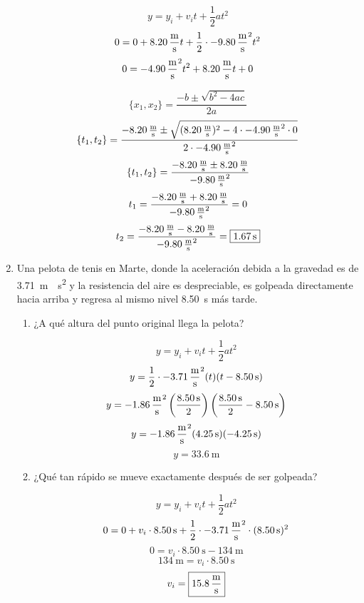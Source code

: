 \documentclass[Análisis.root.tex]{subfiles}
\begin{document}
\begin{enumerate}
        \[y=y_i+v_it+\frac{1}{2}at^2\]
        \[0=0+\SI{8,20}{\meter\over\second}t+\frac{1}{2}\cdot\SI{-9,80}{\meter\over\second\squared}t^2\]
        \[0=-\SI{4,90}{\meter\over\second\squared}t^2+\SI{8,20}{\meter\over\second}t+0\]

        \[\{x_1,x_2\}=\frac{-b\pm\sqrt{b^2-4ac}}{2a}\]
        \[\{t_1,t_2\}=\frac{\SI{-8,20}{\meter\over\second}\pm\sqrt{(\SI{8,20}{\meter\over\second})^2-4\cdot-\SI{4,90}{\meter\over\second\squared}\cdot 0}}{2\cdot-\SI{4,90}{\meter\over\second\squared}}\]
        \[\{t_1,t_2\}=\frac{\SI{-8,20}{\meter\over\second}\pm\SI{8,20}{\meter\over\second}}{-\SI{9,80}{\meter\over\second\squared}}\]
        \[t_1=\frac{\SI{-8,20}{\meter\over\second}+\SI{8,20}{\meter\over\second}}{-\SI{9,80}{\meter\over\second\squared}}=0\]
        \[t_2=\frac{\SI{-8,20}{\meter\over\second}-\SI{8,20}{\meter\over\second}}{-\SI{9,80}{\meter\over\second\squared}}=\boxed{\SI{1,67}{\second}}\]

  \item Una pelota de tenis en Marte, donde la aceleración debida a la gravedad es de \SI{3,71}{\meter\over\second\squared} y la resistencia del aire es despreciable, es golpeada directamente hacia arriba y regresa al mismo nivel \SI{8,50}{\second} más tarde.

        \begin{enumerate}
          \item ¿A qué altura del punto original llega la pelota?

                \[y=y_i+v_it+\frac{1}{2}at^2\]
                \[y=\frac{1}{2}\cdot\SI{-3,71}{\meter\over\second\squared}(t)(t-\SI{8,50}{\second})\]
                \[y=\SI{-1,86}{\meter\over\second\squared}\left(\frac{\SI{8,50}{\second}}{2}\right)\left(\frac{\SI{8,50}{\second}}{2}-\SI{8,50}{\second}\right)\]
                \[y=\SI{-1,86}{\meter\over\second\squared}(\SI{4,25}{\second})(\SI{-4,25}{\second})\]
                \[y=\boxed{\SI{33,6}{\meter}}\]

          \item ¿Qué tan rápido se mueve exactamente después de ser golpeada?

                \[y=y_i+v_it+\frac{1}{2}at^2\]
                \[0=0+v_i\cdot\SI{8,50}{\second}+\frac{1}{2}\cdot\SI{-3,71}{\meter\over\second\squared}\cdot(\SI{8,50}{\second})^2\]
                \[0=v_i\cdot\SI{8,50}{\second}-\SI{134}{\meter}\]
                \[\SI{134}{\meter}=v_i\cdot\SI{8,50}{\second}\]
                \[v_i=\boxed{\SI{15,8}{\meter\over\second}}\]
        \end{enumerate}


\end{enumerate}
\end{document}
